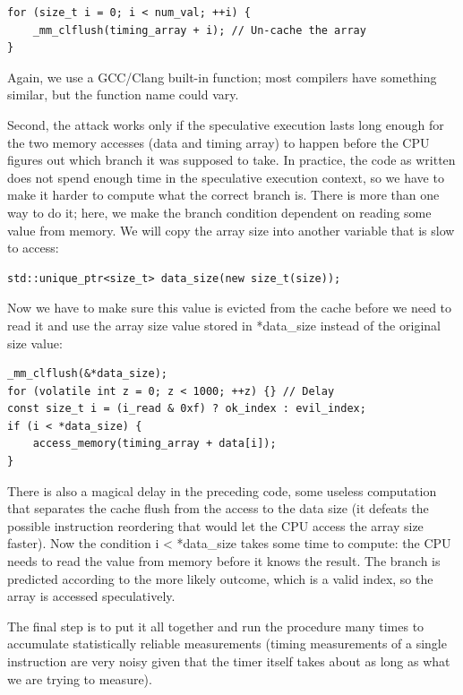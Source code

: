 \begin{lstlisting}[style=styleCXX]
for (size_t i = 0; i < num_val; ++i) {
	_mm_clflush(timing_array + i); // Un-cache the array
}
\end{lstlisting}

Again, we use a GCC/Clang built-in function; most compilers have something similar, but the function name could vary.

Second, the attack works only if the speculative execution lasts long enough for the two memory accesses (data and timing array) to happen before the CPU figures out which branch it was supposed to take. In practice, the code as written does not spend enough time in the speculative execution context, so we have to make it harder to compute what the correct branch is. There is more than one way to do it; here, we make the branch condition dependent on reading some value from memory. We will copy the array size into another variable that is slow to access:

\begin{lstlisting}[style=styleCXX]
std::unique_ptr<size_t> data_size(new size_t(size));
\end{lstlisting}

Now we have to make sure this value is evicted from the cache before we need to read it and use the array size value stored in *data\_size instead of the original size value:

\begin{lstlisting}[style=styleCXX]
_mm_clflush(&*data_size);
for (volatile int z = 0; z < 1000; ++z) {} // Delay
const size_t i = (i_read & 0xf) ? ok_index : evil_index;
if (i < *data_size) {
	access_memory(timing_array + data[i]);
}
\end{lstlisting}

There is also a magical delay in the preceding code, some useless computation that separates the cache flush from the access to the data size (it defeats the possible instruction reordering that would let the CPU access the array size faster). Now the condition i < *data\_size takes some time to compute: the CPU needs to read the value from memory before it knows the result. The branch is predicted according to the more likely outcome, which is a valid index, so the array is accessed speculatively.


The final step is to put it all together and run the procedure many times to accumulate statistically reliable measurements (timing measurements of a single instruction are very noisy given that the timer itself takes about as long as what we are trying to measure).

